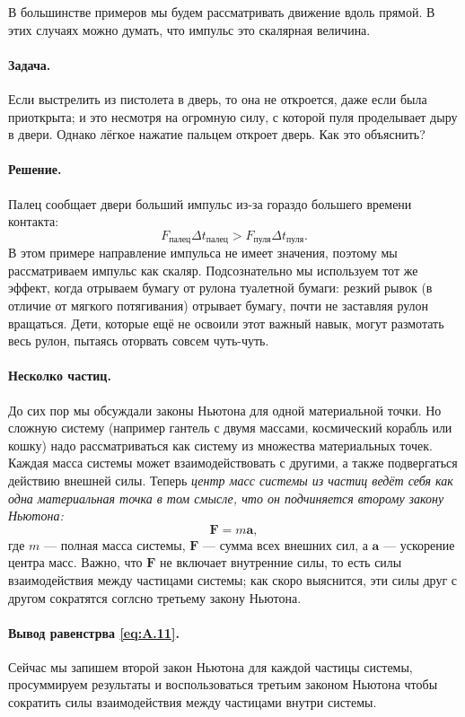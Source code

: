 В большинстве примеров мы будем рассматривать движение вдоль прямой.
В этих случаях можно думать, что импульс это скалярная величина.

\paragraph{Задача.}
Если выстрелить из пистолета в дверь, то она не откроется, даже если была приоткрыта;
и это несмотря на огромную силу, с которой пуля проделывает дыру в двери.
Однако лёгкое нажатие пальцем откроет дверь.
Как это объяснить?

\paragraph{Решение.}
Палец сообщает двери больший импульс
из-за гораздо большего времени контакта:
\[
F_{\text{палец}}  \Delta t_{\text{палец}}
>
F_{\text{пуля}}  \Delta t_{\text{пуля}}.
\]
В этом примере направление импульса не имеет значения, поэтому мы рассматриваем импульс как скаляр.
Подсознательно мы используем тот же эффект, когда отрываем бумагу от рулона туалетной бумаги: резкий рывок (в отличие от мягкого потягивания) отрывает бумагу, почти не заставляя
рулон вращаться.
Дети, которые ещё не освоили этот важный навык, могут размотать весь рулон, пытаясь оторвать совсем чуть-чуть.

\paragraph{Несколко частиц.}
До сих пор мы обсуждали законы Ньютона для одной материальной точки.
Но сложную систему (например гантель с двумя массами, космический корабль или кошку) надо рассматриваться как систему из множества материальных точек.
Каждая масса системы может взаимодействовать с другими, а также подвергаться
действию внешней силы.
Теперь \emph{центр масс системы из частиц ведёт себя как одна материальная точка в том смысле, что он подчиняется второму закону Ньютона:}
\begin{equation}
    \mathbf{F}=m \mathbf{a},
    \label{eq:A.11}
\end{equation}
где $m$ --- полная масса системы, $\mathbf{F}$ --- сумма всех внешних сил,
а $\mathbf{a}$ --- ускорение центра масс.
Важно, что $\mathbf{F}$ не включает внутренние силы, то есть силы взаимодействия между частицами системы;
как скоро выяснится, эти силы друг с другом сократятся соглсно третьему закону Ньютона.

\paragraph{Вывод равенстрва \eqref{eq:A.11}.}
Сейчас мы запишем второй закон Ньютона для каждой частицы системы, просуммируем результаты и воспользоваться
третьим законом Ньютона чтобы сократить силы взаимодействия между частицами внутри системы.

